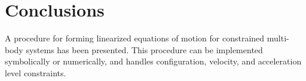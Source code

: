 \documentclass[smallcondensed,final]{svjour3}                     %
\begin{document}
%
%
\section{Conclusions}
A procedure for forming linearized equations of motion for constrained
multi-body systems has been presented.  This procedure can be implemented
symbolically or numerically, and handles configuration, velocity, and
acceleration level constraints. 
\end{document}
